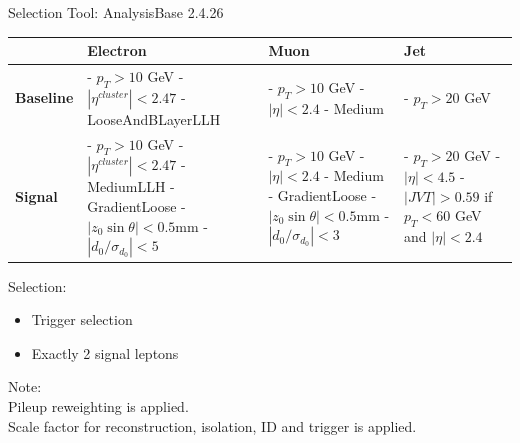 \documentclass[mathserif,serif]{beamer}
\begin{document}
\begin{frame}{Selection}
\small
Tool: AnalysisBase 2.4.26 \\

\centering
\begin{table}
\small
\begin{tabularx}{\textwidth}{p{1.5cm} | p{3cm} | p{3cm} | p{3cm}}
& \textbf{Electron} & \textbf{Muon} & \textbf{Jet}\\
\hline
\textbf{Baseline}
& - $p_T>10$ GeV \newline - $|\eta^{cluster}| < 2.47$ \newline - LooseAndBLayerLLH
& - $p_T>10$ GeV \newline - $|\eta| < 2.4$ \newline - Medium
& - $p_T>20$ GeV \\
\hline
\textbf{Signal}
& - $p_T > 10$ GeV \newline - $|\eta^{cluster}| < 2.47$ \newline - MediumLLH \newline - GradientLoose \newline - $|z_0 \sin \theta| < 0.5$mm \newline - $|d_0/\sigma_{d_0}| < 5$
& - $p_T > 10$ GeV \newline - $|\eta| < 2.4$ \newline - Medium \newline - GradientLoose \newline - $|z_0 \sin \theta| < 0.5$mm \newline - $|d_0/\sigma_{d_0}| < 3$
& - $p_T > 20$ GeV \newline - $|\eta|<4.5$ \newline \newline - $|JVT| > 0.59$ \newline if $p_T < 60$ GeV \newline and $|\eta| < 2.4$
\end{tabularx}
\end{table}

\raggedright
Selection:
\begin{itemize}
\item Trigger selection
\item Exactly 2 signal leptons
\end{itemize}

\tiny
Note: \\
Pileup reweighting is applied. \\
Scale factor for reconstruction, isolation, ID and trigger is applied.
\end{frame}
\end{document}
